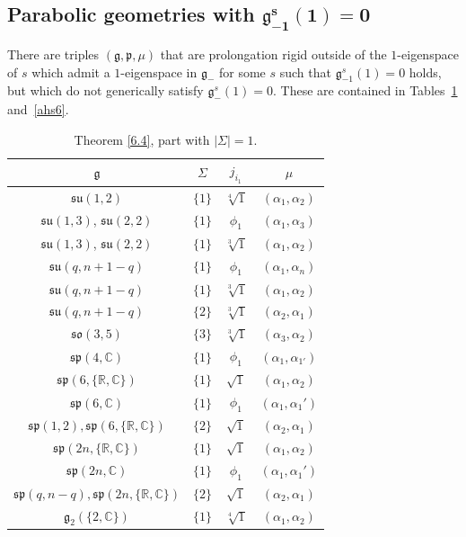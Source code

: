 \documentclass[pdftex]{sigma}
\newcommand{\Si}{\Sigma}
\newcommand{\fg}{\mathfrak g}
\newcommand{\fp}{\mathfrak p}
\numberwithin{equation}{section}
\begin{document}
\subsection[Parabolic geometries with $\fg_{-1}^s(1)=0$]{Parabolic geometries with $\boldsymbol{\fg_{-1}^s(1)=0}$}\label{sec5.3}
There are triples $(\fg,\fp,\mu)$ that are prolongation rigid outside of the $1$-eigenspace of $s$ which admit a $1$-eigenspace in $\fg_-$ for some $s$ such that $\fg_{-1}^s(1)=0$ holds, but which do not generically satisfy $\fg_-^s(1)=0$. These are contained in Tables~\ref{ahs5} and~\ref{ahs6}.

\begin{table}[th!]\centering\caption{Theorem \ref{6.4}, part with $|\Si|=1$.}\label{ahs5}\vspace{1mm}
\begin{tabular}{|c|c|c|c|}
\hline
$\fg$ & $\Sigma$ & $j_{i_1}$ & $\mu$\\
\hline
\hline
$\mathfrak{su}(1,2)$ & $\{1\}$& $\sqrt[4]{1}$ & $(\alpha_1,\alpha_2)$ \\
\hline
$\mathfrak{su}(1,3)$, $\mathfrak{su}(2,2)$ & $\{1\}$& $\phi_1$ & $(\alpha_1,\alpha_3)$ \\
\hline
$\mathfrak{su}(1,3)$, $\mathfrak{su}(2,2)$ & $\{1\}$&$\sqrt[3]{1}$ & $(\alpha_1,\alpha_2)$ \\
\hline
$\mathfrak{su}(q,n+1-q)$ & $\{1\}$& $\phi_1$ & $(\alpha_1,\alpha_n)$ \\
\hline
$\mathfrak{su}(q,n+1-q)$ & $\{1\}$&$\sqrt[3]{1}$ & $(\alpha_1,\alpha_2)$ \\
\hline
$\mathfrak{su}(q,n+1-q)$ & $\{2\}$ &$\sqrt[3]{1}$& $(\alpha_2,\alpha_1)$\\
\hline
$\mathfrak{so}(3,5)$&$\{ 3\}$&$\sqrt[3]{1}$&$(\alpha_3,\alpha_2)$ \\
\hline
$\mathfrak{sp}(4,\mathbb{C})$ & $\{1\}$&$\phi_1$& $(\alpha_{1},\alpha_{1'})$\\
\hline
$\mathfrak{sp}(6,\{\mathbb{R,C}\})$ & $\{1\}$ &$\sqrt{1}$& $(\alpha_1,\alpha_2)$ \\
\hline
$\mathfrak{sp}(6,\mathbb{C})$ & $\{1\}$&$\phi_1$& $(\alpha_1,\alpha_1')$ \\
\hline
$\mathfrak{sp}(1,2), \mathfrak{sp}(6,\{\mathbb{R, C}\})$ & $\{2\}$& $\sqrt{1}$ & $(\alpha_2,\alpha_1)$ \\
\hline
$\mathfrak{sp}(2n,\{\mathbb{R,C}\})$ & $\{1\}$ &$\sqrt{1}$& $(\alpha_1,\alpha_2)$ \\
\hline
$\mathfrak{sp}(2n,\mathbb{C})$ & $\{1\}$&$\phi_1$& $(\alpha_1,\alpha_1')$ \\
\hline
$\mathfrak{sp}(q,n-q), \mathfrak{sp}(2n,\{\mathbb{R, C}\})$ & $\{2\}$& $\sqrt{1}$ & $(\alpha_2,\alpha_1)$ \\
\hline
$\mathfrak{g}_{2}(\{2,\mathbb{C}\})$ & $\{1\}$&$\sqrt[4]{1}$&$(\alpha_1,\alpha_2)$\\
\hline
\end{tabular}
\end{table}
\end{document}
